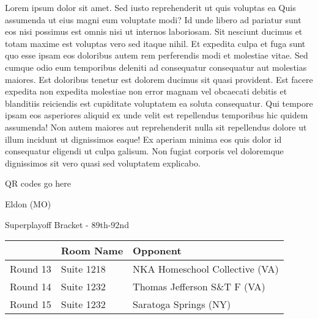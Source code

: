 \documentclass{article}%
\begin{document}
\vspace*{8pt}%
\linebreak%
\newline%
\newline%
Lorem ipsum dolor sit amet. Sed iusto reprehenderit ut quis voluptas ea Quis assumenda ut eius magni eum voluptate modi? Id unde libero ad pariatur sunt eos nisi possimus est omnis nisi ut internos laboriosam. Sit nesciunt ducimus et totam maxime est voluptas vero sed itaque nihil. Et expedita culpa et fuga sunt quo esse ipsam eos doloribus autem rem perferendis modi et molestiae vitae.\newline%
\newline%
Sed cumque odio eum temporibus deleniti ad consequatur consequatur aut molestias maiores. Est doloribus tenetur est dolorem ducimus sit quasi provident. Est facere expedita non expedita molestiae non error magnam vel obcaecati debitis et blanditiis reiciendis est cupiditate voluptatem ea soluta consequatur. Qui tempore ipsam eos asperiores aliquid ex unde velit est repellendus temporibus hic quidem assumenda!\newline%
\newline%
Non autem maiores aut reprehenderit nulla sit repellendus dolore ut illum incidunt ut dignissimos eaque! Ex aperiam minima eos quis dolor id consequatur eligendi ut culpa galisum. Non fugiat corporis vel doloremque dignissimos sit vero quasi sed voluptatem explicabo.\newline%
\newline%
%
\vspace*{30pt}%
\begin{center}%
\begin{Huge}%
QR codes go here%
\end{Huge}%
\end{center}%
\newpage%
\begin{center}%
\begin{Huge}%
Eldon (MO)%
\end{Huge}%
\vspace*{8pt}%
\linebreak%
\begin{Large}%
Superplayoff Bracket {-} 89th{-}92nd%
\end{Large}%
\end{center}%
%
\begin{tabularx}{\textwidth}{|c|Y|Y|}%
\hline%
&Room Name&Opponent\\%
\hline%
Round 13&Suite 1218&NKA Homeschool Collective (VA)\\%
Round 14&Suite 1232&Thomas Jefferson S\&T F (VA)\\%
Round 15&Suite 1232&Saratoga Springs (NY)\\%
\hline%
\end{tabularx}%
\end{document}
